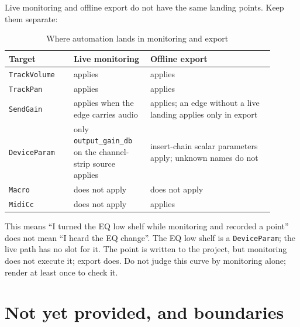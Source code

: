 Live monitoring and offline export do not have the same landing points. Keep them separate:

\begin{table}[htbp]
\centering
\small
\begin{tabular}{@{}p{0.22\linewidth}p{0.26\linewidth}p{0.42\linewidth}@{}}
\hline
Target & Live monitoring & Offline export \\
\hline
\texttt{TrackVolume} & applies & applies \\
\texttt{TrackPan} & applies & applies \\
\texttt{SendGain} & applies when the edge carries audio & applies; an edge without a live landing applies only in export \\
\texttt{DeviceParam} & only \texttt{output\_gain\_db} on the channel-strip source applies & insert-chain scalar parameters apply; unknown names do not \\
\texttt{Macro} & does not apply & does not apply \\
\texttt{MidiCc} & does not apply & applies \\
\hline
\end{tabular}
\caption{Where automation lands in monitoring and export}
\label{tab:automation-apply}
\end{table}

This means ``I turned the EQ low shelf while monitoring and recorded a point'' does not mean ``I heard the EQ change''. The EQ low shelf is a \texttt{DeviceParam}; the live path has no slot for it. The point is written to the project, but monitoring does not execute it; export does. Do not judge this curve by monitoring alone; render at least once to check it.

\section{Not yet provided, and boundaries}

